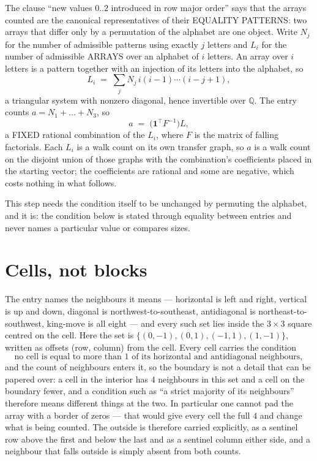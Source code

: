 \documentclass[11pt,a4paper]{article}
\theoremstyle{plain}
\theoremstyle{definition}
\begin{document}
The clause ``new values $0..2$ introduced in row major order'' says that the arrays
counted are the canonical representatives of their EQUALITY PATTERNS: two arrays that differ
only by a permutation of the alphabet are one object. Write $N_j$ for the number of admissible
patterns using exactly $j$ letters and $L_i$ for the number of admissible ARRAYS over an
alphabet of $i$ letters. An array over $i$ letters is a pattern together with an injection of
its letters into the alphabet, so
\[
L_i\;=\;\sum_{j}N_j\,i(i-1)\cdots(i-j+1),
\]
a triangular system with nonzero diagonal, hence invertible over $\mathbb{Q}$. The entry
counts $a=N_1+\dots+N_{3}$, so
\[
a\;=\;\bigl(\mathbf{1}^{\!\top}F^{-1}\bigr)L ,
\]
a FIXED rational combination of the $L_i$, where $F$ is the matrix of falling factorials.
Each $L_i$ is a walk count on its own transfer graph, so $a$ is a walk count on the disjoint
union of those graphs with the combination's coefficients placed in the starting vector; the
coefficients are rational and some are negative, which costs nothing in what follows.

This step needs the condition itself to be unchanged by permuting the alphabet, and it is:
the condition below is stated through equality between entries and never names a particular
value or compares sizes.

\section{Cells, not blocks}

The entry names the neighbours it means --- horizontal is left and right, vertical is up and
down, diagonal is northwest-to-southeast, antidiagonal is northeast-to-southwest, king-move is
all eight --- and every such set lies inside the $3\times3$ square centred on the cell. Here
the set is $\{(0,-1), (0,1), (-1,1), (1,-1)\}$, written as offsets (row, column) from the cell. Every cell carries
the condition
\[
\text{no cell is equal to more than 1 of its horizontal and antidiagonal neighbours},
\]
and the count of neighbours enters it, so the boundary is not a detail that can be papered
over: a cell in the interior has $4$ neighbours in this set and a cell on the boundary
fewer, and a condition such as ``a strict majority of its neighbours'' therefore means
different things at the two. In particular one cannot pad the array with a border of zeros ---
that would give every cell the full $4$ and change what is being counted. The outside is
therefore carried
explicitly, as a sentinel row above the first and below the last and as a sentinel column
either side, and a neighbour that falls outside is simply absent from both counts.
\end{document}
